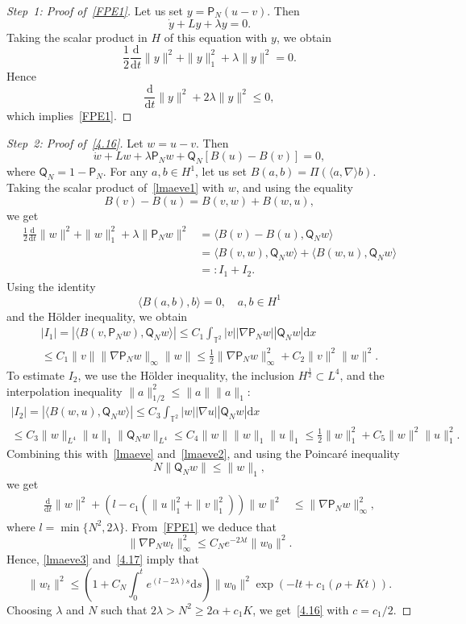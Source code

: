 \documentclass[AHL,Unicode,longabstracts]{cedram}
\newcommand{\T}{{\mathbb T}}
\newcommand{\la}{\lambda}
\newcommand{\ty}{\infty}
\newcommand{\pp}{{{\mathsf P}_N}}
\newcommand{\qq}{{{\mathsf Q}_N}}
\newcommand{\lag}{\langle}
\newcommand{\rag}{\rangle}
\newcommand{\dd}{\mathrm{d}}
\newenvironment{step}{\begin{proof}}{\let\qed\relax \end{proof}}
\begin{document}
\begin{proofc}

\begin{step}[Step~1: Proof of~\eqref{FPE1}]
Let us set $y= \pp(u-v)$. Then
\[
\dot y +L y +\la y =0.
\]
Taking the scalar product in $H$ of this equation with $y$, we obtain
\[
\frac12\frac{\dd}{\dd t} \|y\|^2+\|y\|_1^2+\la \| y\|^2=0.
\]
Hence
\[
\frac{\dd}{\dd t} \|y\|^2 +2\la \| y\|^2\le0,
\]
which implies~\eqref{FPE1}.
\end{step}

\begin{proof}[Step~2: Proof of~\eqref{4.16}]
Let $w= u-v$. Then
\begin{equation}\label{lmaeve1}
\dot w+Lw+\la \pp w+ \qq[B(u)-B(v)]=0,
\end{equation}
where $\qq=1-\pp$. For any $a, b \in H^1$, let us set $B(a,b)=\Pi(\langle a,\nabla \rangle b)$. Taking the scalar product of~\eqref{lmaeve1} with $w$, and using the equality
\begin{equation}\label{ezecsd}
B(v)-B(u)=B(v,w)+B(w,u),
\end{equation}
we get
\begin{align}\label{lmaeve}
\frac12\frac{\dd}{\dd t} \|w\|^2+\|w\|_1^2+\la \| \pp w\|^2&= \lag B(v)-B(u),\qq w\rag\nonumber\\&= \lag B(v,w),\qq w\rag+ \lag B(w,u),\qq w\rag\nonumber\\&=:I_1+I_2.
\end{align}
Using the identity
\[
\lag B(a,b),b\rag=0, \quad a,b\in H^1
\]
and the H\"older inequality, we obtain
\begin{multline}\label{lmaeve2}
|I_1|=| \lag B(v, \pp w), \qq w\rag| \le C_1\int_{\T^2} |v| |\nabla \pp w|| \qq w| \dd x \\
\le C_1\|v\| \|\nabla\pp w\|_{\ty} \| w\| \le \frac12 \|\nabla\pp w\|_{\ty}^2+C_2 \|v\|^2 \|w\|^2.
\end{multline}
To estimate $I_2$, we use the H\"older inequality, the inclusion $H^{\frac12}\subset L^4$, and the interpolation inequality $\|a\|_{1/2}^2\le \|a\|\|a\|_1$:
\begin{multline*}
|I_2|=|\lag B(w,u),\qq w\rag|\le C_3\int_{\T^2} |w||\nabla u| |\qq w| \dd x\\
\le C_3 \|w\|_{L^4} \|u\|_1 \|\qq w\|_{L^4} \le C_4 \|w\|\|w\|_1 \|u\|_1\le \frac12 \|w\|_1^2 + C_5 \|w\|^2 \|u\|_1^2.
\end{multline*}
Combining this with~\eqref{lmaeve} and~\eqref{lmaeve2}, and using the Poincar\'e inequality
\[
N\|\qq w\|\le \|w\|_1,
\]
we get
\begin{align}\label{lmaeve3}
\frac{\dd}{\dd t} \|w\|^2+\left(l-c_1(\| u\|_1^2+\| v\|_1^2)\right)\|w\|^2 &\le \|\nabla\pp w\|_{\ty}^2,
\end{align}
where $l=\min\{N^2, 2\la\} $. From~\eqref{FPE1} we deduce that
\[
\|\nabla\pp w_t\|_{\ty}^2\le C_N e^{-2\la t}\|w_0\|^2.
\]
Hence, \eqref{lmaeve3} and~\eqref{4.17} imply that
\[
\|w_t\|^2\le \left(1+ C_N \int_0^t e^{(l-2\la)s} \dd s\right) \|w_0\|^2\exp\left(-l t+c_1 (\rho+Kt)\right).
\]
Choosing $\la$ and $N$ such that $2\la> N^2\ge 2\alpha +c_1K$, we get~\eqref{4.16} with $c=c_1/2$.
\end{proof}
\let\qed\relax
\end{proofc}
\end{document}
